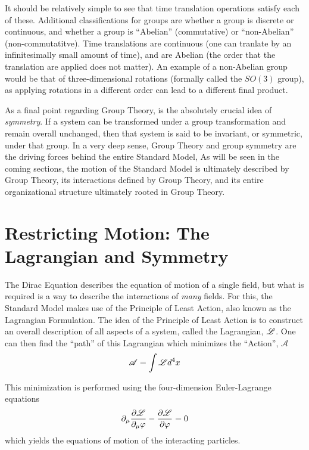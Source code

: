     It should be relatively simple to see that time translation operations satisfy each of these.
    Additional classifications for groups are whether a group is discrete or continuous,
        and whether a group is ``Abelian'' (commutative) or ``non-Abelian'' (non-commutatitve).
    Time translations are continuous (one can tranlate by an infinitesimally small amount of time),
        and are Abelian (the order that the translation are applied does not matter).
    An example of a non-Abelian group would be that of three-dimensional rotations (formally called the $SO(3)$ group),
        as applying rotations in a different order can lead to a different final product.

    As a final point regarding Group Theory, is the absolutely crucial idea of \textit{symmetry}.
    If a system can be transformed under a group transformation and remain overall unchanged,
        then that system is said to be invariant, or symmetric, under that group.
    In a very deep sense, Group Theory and group symmetry are the driving forces behind the entire Standard Model,
    As will be seen in the coming sections,
        the motion of the Standard Model is ultimately described by Group Theory,
        its interactions defined by Group Theory,
        and its entire organizational structure ultimately rooted in Group Theory.

\section{Restricting Motion: The Lagrangian and Symmetry}
    
    The Dirac Equation describes the equation of motion of a single field,
        but what is required is a way to describe the interactions of \textit{many} fields.
    For this, the Standard Model makes use of the Principle of Least Action,
        also known as the Lagrangian Formulation\cite{Halzen_book}.
    The idea of the Principle of Least Action is to construct an overall description of all aspects of a system,
        called the Lagrangian, $\mathscr{L}$.
    One can then find the ``path'' of this Lagrangian which minimizes the ``Action'', $\mathscr{A}$
    \begin{equation} %
        \mathscr{A} = \int \Lag d^4 x
    \end{equation}

    This minimization is performed using the four-dimension Euler-Lagrange equations
    \begin{equation}
        \partial_\mu \frac{\partial \mathscr{L}}{\partial_\mu \varphi } - \frac{\partial \mathscr{L}}{\partial \varphi} = 0
    \end{equation}
    which yields the equations of motion of the interacting particles.

